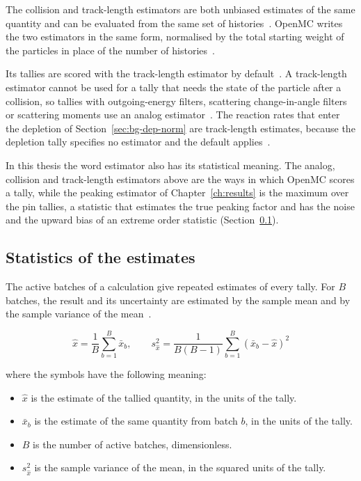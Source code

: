 The collision and track-length estimators are both unbiased estimates of the same quantity and can be evaluated
from the same set of histories~\cite{lux_koblinger_1991}. OpenMC writes
the two estimators in the same form, normalised by the total starting
weight of the particles in place of the number of
histories~\cite{openmc_docs}.

Its tallies are scored with the
track-length estimator by default~\cite{romano_openmc_2015}. A
track-length estimator cannot be used for a tally that needs the state of the
particle after a collision, so tallies with outgoing-energy filters,
scattering change-in-angle filters or scattering moments use an analog
estimator~\cite{openmc_docs}. The reaction rates
that enter the depletion of Section~\ref{sec:bg-dep-norm} are
track-length estimates, because the depletion tally specifies no estimator
and the default applies~\cite{romano_2021_depletion,openmc_docs}.

In this thesis the word estimator also has its statistical meaning. The
analog, collision and track-length estimators above are the ways in
which OpenMC scores a tally, while the peaking estimator of
Chapter~\ref{ch:results} is the maximum over the pin tallies, a
statistic that estimates the true peaking factor and has the noise and
the upward bias of an extreme order statistic
(Section~\ref{sec:bg-mc-stats}).

\subsection{Statistics of the estimates}
\label{sec:bg-mc-stats}

The active batches of a calculation give repeated estimates of every tally. For
$B$ batches, the result and its uncertainty are estimated by the sample
mean and by the sample variance of the mean~\cite{lux_koblinger_1991}.

\begin{equation}
\hat{x} = \frac{1}{B}\sum_{b=1}^{B}\bar{x}_b,
\qquad
s_{\hat{x}}^2 = \frac{1}{B(B-1)}\sum_{b=1}^{B}
\left(\bar{x}_b - \hat{x}\right)^2
\label{eq:mc-mean-var}
\end{equation}

\noindent where the symbols have the following meaning:

\begin{itemize}
  \item $\hat{x}$ is the estimate of the tallied quantity, in the units
        of the tally.

  \item $\bar{x}_b$ is the estimate of the same quantity from batch $b$,
        in the units of the tally.

  \item $B$ is the number of active batches, dimensionless.

  \item $s_{\hat{x}}^2$ is the sample variance of the mean, in the
        squared units of the tally.
\end{itemize}

